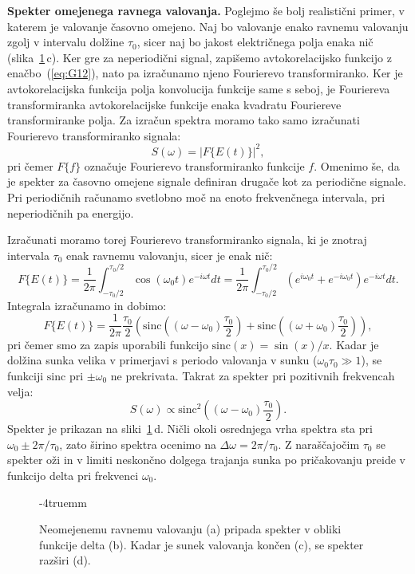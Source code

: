\begin{example}{\bf Spekter omejenega ravnega valovanja.}
Poglejmo še bolj realistični primer, v katerem je valovanje časovno omejeno. Naj bo 
valovanje enako ravnemu valovanju zgolj v intervalu dolžine $\tau_0$, sicer naj bo jakost
električnega polja enaka nič (slika~\ref{fig:08_spekter}\,c).
Ker gre za neperiodični signal, zapišemo avtokorelacijsko
funkcijo z enačbo~(\ref{eq:G12}), nato pa izračunamo njeno Fourierevo transformiranko.
Ker je avtokorelacijska funkcija polja konvolucija funkcije same s seboj, 
je Fouriereva transformiranka avtokorelacijske funkcije enaka kvadratu Fouriereve transformiranke
polja. Za izračun spektra moramo tako samo izračunati Fourierevo transformiranko signala:
\begin{equation}
S(\omega) = |F\{E(t)\}|^2,
\label{eq:08_203}
\end{equation}
pri čemer $F\{f\}$ označuje Fourierevo transformiranko funkcije $f$. Omenimo še, da je spekter
za časovno omejene signale definiran drugače kot za periodične signale. Pri periodičnih računamo
svetlobno moč na enoto frekvenčnega intervala, pri neperiodičnih pa energijo.

Izračunati moramo torej Fourierevo transformiranko signala, ki je znotraj intervala $\tau_0$ 
enak ravnemu valovanju, sicer je enak nič:
\begin{equation}
F\{E(t)\} = \frac{1}{2\pi}\int_{-\tau_0/2}^{\tau_0/2} \cos(\omega_0 t) e^{-i\omega t} dt=
\frac{1}{2\pi}\int_{-\tau_0/2}^{\tau_0/2} \left(e^{i\omega_0 t}+ e^{-i\omega_0 t}\right)  e^{-i\omega t} dt.
\label{eq:08_204}
\end{equation}
Integrala izračunamo in dobimo:
\begin{equation}
F\{E(t)\} = \frac{1}{2\pi}\frac{\tau_0}{2}\left(\mathrm{sinc} \left((\omega-\omega_0)\frac{\tau_0}{2} \right)+
\mathrm{sinc} \left((\omega+\omega_0)\frac{\tau_0}{2} \right) \right),
\label{eq:08_205}
\end{equation}
pri čemer smo za zapis uporabili funkcijo $\mathrm{sinc}(x) = \sin(x)/x$. Kadar je dolžina sunka 
velika v primerjavi s periodo valovanja v sunku ($\omega_0\tau_0 \gg1$), 
se funkciji $\mathrm{sinc}$ pri $\pm\omega_0$ ne 
prekrivata. Takrat za spekter pri pozitivnih frekvencah velja:
\begin{equation}
S(\omega) \propto \mathrm{sinc}^2\left(\left(\omega - \omega_0\right)\frac{\tau_0}{2}\right).
\label{eq:08_206}
\end{equation}
Spekter je prikazan na sliki~\ref{fig:08_spekter}\,d. Ničli okoli osrednjega vrha 
spektra sta pri $\omega_0 \pm 2\pi/\tau_0$, zato širino spektra ocenimo
na $\Delta \omega = 2\pi/\tau_0$. Z naraščajočim $\tau_0$ se spekter oži in v limiti 
neskončno dolgega trajanja sunka po pričakovanju
preide v funkcijo delta pri frekvenci $\omega_0$. 
\begin{figure}[ht]
\centering
\def\svgwidth{120truemm} 

\caption{Neomejenemu ravnemu valovanju (a) pripada spekter v obliki funkcije delta (b). Kadar je 
sunek valovanja končen (c), se spekter razširi (d).
}
\label{fig:08_spekter}
\vglue-4truemm
\end{figure}


\end{example}
